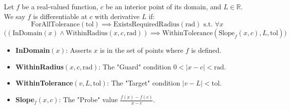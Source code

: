\begin{definition}
Let $f$ be a real-valued function, $c$ be an interior point of its domain, and $L \in \mathbb{R}$. We say $f$ is differentiable at $c$ with derivative $L$ if:
\[
\text{ForAllTolerance}(\text{tol}) \implies \text{ExistsRequiredRadius}(\text{rad}) \text{ s.t. } \forall x 
\]
\[
\Big( (\text{InDomain}(x) \land \text{WithinRadius}(x, c, \text{rad})) \implies \text{WithinTolerance}(\text{Slope}_f(x, c), L, \text{tol}) \Big)
\]

\begin{itemize}
    \item \textbf{InDomain}$(x)$: Asserts $x$ is in the set of points where $f$ is defined.
    \item \textbf{WithinRadius}$(x, c, \text{rad})$: The "Guard" condition $0 < |x - c| < \text{rad}$.
    \item \textbf{WithinTolerance}$(v, L, \text{tol})$: The "Target" condition $|v - L| < \text{tol}$.
    \item \textbf{Slope}$_f(x, c)$: The "Probe" value $\frac{f(x) - f(c)}{x - c}$.
\end{itemize}
\end{definition}


























